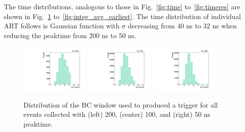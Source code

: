  The time distributions, analogous to those in Fig.~\ref{fig:time} to~\ref{fig:timeres}
 are shown in Fig.~\ref{fig:integ_window} to~\ref{fig:integ_avg_earliest}. 
 The time distribution of individual ART follows is Gaussian function with $\sigma$ decreasing from 40 ns to 32 ns when reducing the peaktime from 200 ns to 50 ns.
\begin{figure}[!htpb]
  \begin{center}
    \includegraphics[width=0.3\textwidth]{figures/gbtanalysis3530/artwin_lin.pdf}
    \includegraphics[width=0.3\textwidth]{figures/gbtanalysis3527/artwin_lin.pdf}
    \includegraphics[width=0.3\textwidth]{figures/gbtanalysis3528/artwin_lin.pdf}
  \end{center}
  \vspace{-10pt}
  \caption{Distribution of the BC window used to produced a trigger for all events collected with (left) 200, (center) 100, and  (right) 50 ns peaktime.}
  \label{fig:integ_window}
\end{figure}
